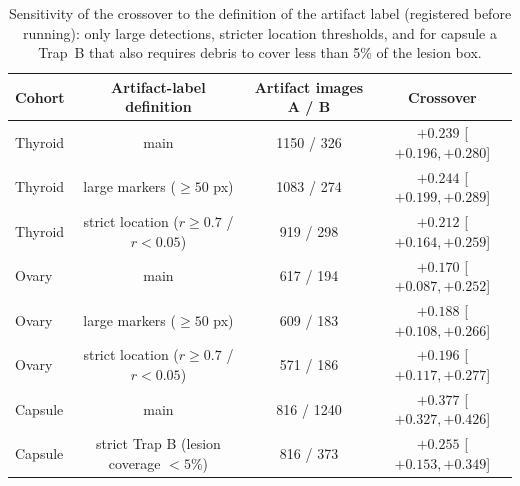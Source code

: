 \begin{table}[H]\centering\scriptsize
\caption{Sensitivity of the crossover to the definition of the artifact label (registered before running): only large detections, stricter location thresholds, and for capsule a Trap~B that also requires debris to cover less than 5\% of the lesion box.}\label{tab:labsens}
\begin{tabular}{lccc}\toprule
Cohort & Artifact-label definition & Artifact images A / B & Crossover \\\midrule
Thyroid & main & 1150 / 326 & $+0.239$ [$+0.196, +0.280$] \\
Thyroid & large markers ($\ge50$ px) & 1083 / 274 & $+0.244$ [$+0.199, +0.289$] \\
Thyroid & strict location ($r\ge0.7$ / $r<0.05$) & 919 / 298 & $+0.212$ [$+0.164, +0.259$] \\
Ovary & main & 617 / 194 & $+0.170$ [$+0.087, +0.252$] \\
Ovary & large markers ($\ge50$ px) & 609 / 183 & $+0.188$ [$+0.108, +0.266$] \\
Ovary & strict location ($r\ge0.7$ / $r<0.05$) & 571 / 186 & $+0.196$ [$+0.117, +0.277$] \\
Capsule & main & 816 / 1240 & $+0.377$ [$+0.327, +0.426$] \\
Capsule & strict Trap B (lesion coverage $<5\%$) & 816 / 373 & $+0.255$ [$+0.153, +0.349$] \\
\bottomrule\end{tabular}
\end{table}
